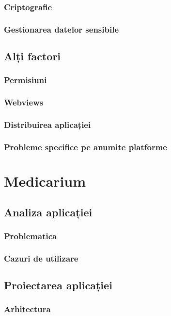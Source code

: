 \documentclass[12pt]{article}
\begin{document}
\subsubsection{Criptografie}
\subsubsection{Gestionarea datelor sensibile}

\subsection{Alți factori}
\subsubsection{Permisiuni}
\subsubsection{Webviews}
\subsubsection{Distribuirea aplicației}
\subsubsection{Probleme specifice pe anumite platforme}

\section{Medicarium}
\subsection{Analiza aplicației}
\subsubsection{Problematica}
\subsubsection{Cazuri de utilizare}

\subsection{Proiectarea aplicației}
\subsubsection{Arhitectura}
\end{document}
